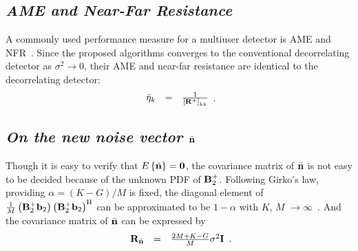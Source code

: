 \documentclass[a4paper,10pt,fleqn, twocolumn]{IEEETran}
\newcommand{\bb}{{\bf b}}
\newcommand{\bn}{{\bf n}}
\newcommand{\bI}{{\bf I}}
\newcommand{\bR}{{\bf R}}
\newcommand{\bB}{{\bf B}}
\newcommand{\bzero}{{\bf 0}}
\begin{document}
\subsection{\em AME and Near-Far Resistance}
A commonly used performance measure for a multiuser detector is
AME and NFR~\cite{Verd98}. Since the proposed algorithms converges
to the conventional decorrelating detector as $\sigma^2\rightarrow
0$, their AME and near-far resistance are identical to the
decorrelating detector:
\begin{equation}
\begin{array}{rcl}
\bar{\eta}_k&=&\frac{1}{\left[\bR^{+}\right]_{kk}}
\end{array}.
\end{equation}

\subsection{\em On the new noise vector $\bar\bn$}
Though it is easy to verify that
$\mbox{E}\left\{\bar\bn\right\}=\bzero$, the covariance matrix of
$\bar\bn$ is not easy to be decided because of the unknown PDF of
$\bB_2^{+}$. Following Girko's law, providing $\alpha=(K-G)/M$ is
fixed, the diagonal element of
$\frac{1}{M}\left(\bB_2^{+}\bb_2\right)\left(\bB_2^{+}\bb_2\right)^{\rm
H}$ can be approximated to be $1-\alpha$ with $K$, $M$
$\rightarrow\infty$~\cite{Muller}. And the covariance matrix of
$\bar\bn$ can be expressed by
\begin{equation}
\begin{array}{rcl}
\bR_{\bar\bn}&=&\frac{2M+K-G}{M}\sigma^{2}\bI
\end{array}.\label{noise_var_new}
\end{equation}
\end{document}

